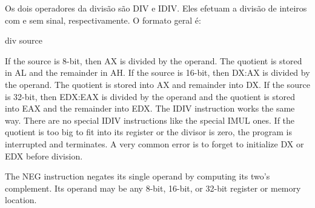 Os dois operadores da divisão são {\code DIV} e {\code IDIV}. Eles efetuam a
divisão de inteiros com e sem sinal, respectivamente. O formato geral é:
\begin{AsmCodeListing}[numbers=none,frame=none]
      div   source
\end{AsmCodeListing}
If the source is 8-bit, then AX is divided by the operand. The
quotient is stored in AL and the remainder in AH. If the source is
16-bit, then DX:AX is divided by the operand. The quotient is stored
into AX and remainder into DX. If the source is 32-bit, then
EDX:EAX is divided by the operand and the quotient is
stored into EAX and the remainder into EDX. The {\code IDIV}
 instruction works the same way. There are no special
{\code IDIV} instructions like the special {\code IMUL} ones. If the
quotient is too big to fit into its register or the divisor is zero,
the program is interrupted and terminates. A very common error is to
forget to initialize DX or EDX before division.

The {\code NEG}  instruction negates its single operand by computing
its two's complement. Its operand may be any 8-bit, 16-bit, or 32-bit
register or memory location.

